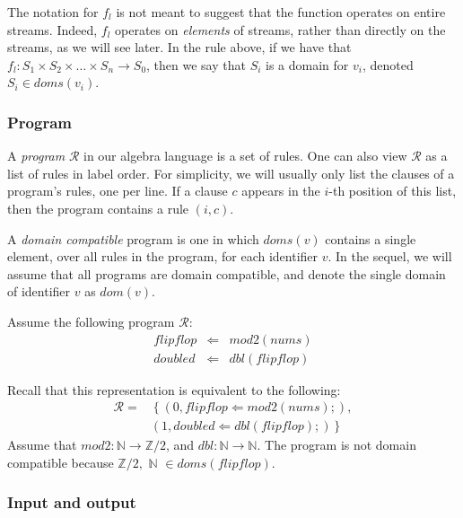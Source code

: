 The notation for $f_l$ is not meant to suggest that the function operates on entire streams.  Indeed, $f_l$ operates on {\em elements} of streams, rather than directly on the streams, as we will see later.  In the rule above, if we have that $f_l : S_1 \times S_2 \times \dots \times S_n \rightarrow S_0$, then we say that $S_i$ is a domain for $v_i$, denoted $S_i \in doms(v_i)$.

\subsubsection{Program}

A {\em program} $\mathcal{R}$ in our algebra language is a set of rules.  One can also view $\mathcal{R}$ as a list of rules in label order.  For simplicity, we will usually only list the clauses of a program's rules, one per line.  If a clause $c$ appears in the $i$-th position of this list, then the program contains a rule $(i,c)$.

A {\em domain compatible} program is one in which $doms(v)$ contains a single element, over all rules in the program, for each identifier $v$.  In the sequel, we will assume that all programs are domain compatible, and denote the single domain of identifier $v$ as $dom(v)$.

\begin{example}
Assume the following program $\mathcal{R}$:
\begin{eqnarray*}
flipflop & \Leftarrow & mod2(nums) \\
doubled & \Leftarrow & dbl(flipflop)
\end{eqnarray*}

Recall that this representation is equivalent to the following:
\begin{equation*}
\begin{split}
\mathcal{R} = & \left\{(0, flipflop \Leftarrow mod2(nums);), \right. \\
& \left. (1, doubled \Leftarrow dbl(flipflop);) \right\}
\end{split}
\end{equation*}
Assume that $mod2 : \mathbb{N} \rightarrow \mathbb{Z}/2$, and $dbl : \mathbb{N} \rightarrow \mathbb{N}$.  The program is not domain compatible because $\mathbb{Z}/2, \,\, \mathbb{N} \,\, \in doms(flipflop)$.
\end{example}

\subsubsection{Input and output}

